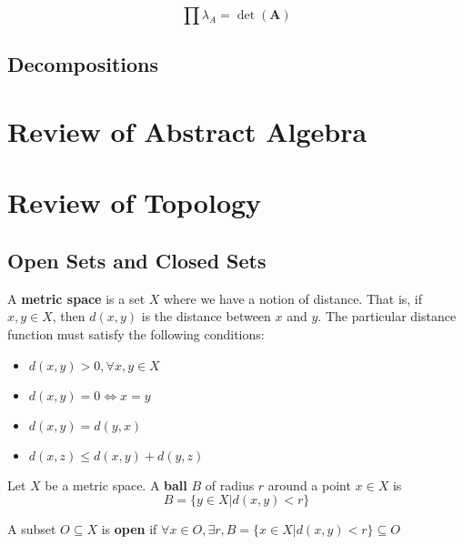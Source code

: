 			\begin{corollary}
				\begin{equation}
					\prod \lambda_A = \det(\mathbf{A})
				\end{equation}
			\end{corollary}


		\section{Decompositions}

	\chapter{Review of Abstract Algebra}

	\chapter{Review of Topology}
		\section{Open Sets and Closed Sets}
			\begin{definition}
				A \textbf{metric space} is a set $X$ where we have a notion of distance. That is, if $x, y \in X$, then $d(x, y)$ is the distance between $x$ and $y$. The particular distance function must satisfy the following conditions:
				\begin{itemize}
					\item $d(x, y) > 0, \forall x, y \in X$
					\item $d(x, y) = 0 \iff x=y$
					\item $d(x, y) = d(y, x)$
					\item $d(x, z) \le d(x, y) + d(y, z)$
				\end{itemize}
			\end{definition}

			\begin{definition}[Ball]
				Let $X$ be a metric space. A \textbf{ball} $B$ of radius $r$ around a point $x \in X$ is
				\begin{equation}
					B = \{y \in X|d(x, y) < r\}
				\end{equation}
			\end{definition}

			\begin{definition}
				A subset $O \subseteq X$ is \textbf{open} if $\forall x \in O, \exists r, B=\{x\in X|d(x, y) < r\} \subseteq O$
			\end{definition}

